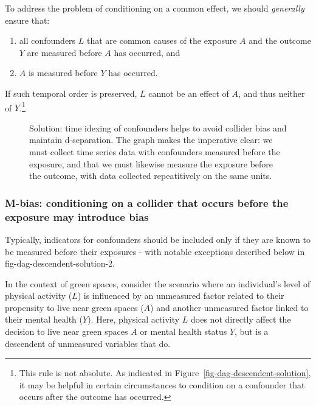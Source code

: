 \documentclass[
  singlecolumn]{article}
\providecommand{\tightlist}{%
  \setlength{\itemsep}{0pt}\setlength{\parskip}{0pt}}\usepackage{longtable,booktabs,array}
\begin{document}
To address the problem of conditioning on a common effect, we should
\emph{generally} ensure that:

\begin{enumerate}
\def\labelenumi{\arabic{enumi}.}
\tightlist
\item
  all confounders \(L\) that are common causes of the exposure \(A\) and
  the outcome \(Y\) are measured before \(A\) has occurred, and
\item
  \(A\) is measured before \(Y\) has occurred.
\end{enumerate}

If such temporal order is preserved, \(L\) cannot be an effect of \(A\),
and thus neither of \(Y\).\footnote{This rule is not absolute. As
  indicated in Figure~\ref{fig-dag-descendent-solution}, it may be
  helpful in certain circumstances to condition on a confounder that
  occurs after the outcome has occurred.}

\begin{figure}[htb]


\caption{\label{fig-dag-common-effect-solution}Solution: time idexing of
confounders helps to avoid collider bias and maintain d-separation. The
graph makes the imperative clear: we must collect time series data with
confounders measured before the exposure, and that we must likewise
measure the exposure before the outcome, with data collected
repeatitively on the same units.}

\end{figure}%

\subsubsection{M-bias: conditioning on a collider that occurs before the
exposure may introduce
bias}\label{m-bias-conditioning-on-a-collider-that-occurs-before-the-exposure-may-introduce-bias}

Typically, indicators for confounders should be included only if they
are known to be measured before their exposures - with notable
exceptions described below in fig-dag-descendent-solution-2.

In the context of green spaces, consider the scenario where an
individual's level of physical activity (\(L\)) is influenced by an
unmeasured factor related to their propensity to live near green spaces
(\(A\)) and another unmeasured factor linked to their mental health
(\(Y\)). Here, physical activity \(L\) does not directly affect the
decision to live near green spaces \(A\) or mental health status \(Y\),
but is a descendent of unmeasured variables that do.
\end{document}
